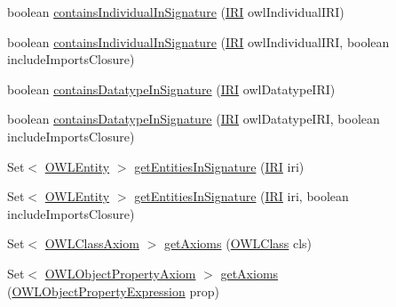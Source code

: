 \begin{DoxyCompactItemize}
\item 
boolean \hyperlink{interfaceorg_1_1semanticweb_1_1owlapi_1_1model_1_1_o_w_l_ontology_a74a8d82cd98c58960f8a2532610ff102}{contains\-Individual\-In\-Signature} (\hyperlink{classorg_1_1semanticweb_1_1owlapi_1_1model_1_1_i_r_i}{I\-R\-I} owl\-Individual\-I\-R\-I)
\item 
boolean \hyperlink{interfaceorg_1_1semanticweb_1_1owlapi_1_1model_1_1_o_w_l_ontology_af1fa719c72a742706f795f344876c2d8}{contains\-Individual\-In\-Signature} (\hyperlink{classorg_1_1semanticweb_1_1owlapi_1_1model_1_1_i_r_i}{I\-R\-I} owl\-Individual\-I\-R\-I, boolean include\-Imports\-Closure)
\item 
boolean \hyperlink{interfaceorg_1_1semanticweb_1_1owlapi_1_1model_1_1_o_w_l_ontology_ac9ccfd408cc970aaab2c5edab49b8635}{contains\-Datatype\-In\-Signature} (\hyperlink{classorg_1_1semanticweb_1_1owlapi_1_1model_1_1_i_r_i}{I\-R\-I} owl\-Datatype\-I\-R\-I)
\item 
boolean \hyperlink{interfaceorg_1_1semanticweb_1_1owlapi_1_1model_1_1_o_w_l_ontology_ab6880d8d511f062df0362fd32fd9cb87}{contains\-Datatype\-In\-Signature} (\hyperlink{classorg_1_1semanticweb_1_1owlapi_1_1model_1_1_i_r_i}{I\-R\-I} owl\-Datatype\-I\-R\-I, boolean include\-Imports\-Closure)
\item 
Set$<$ \hyperlink{interfaceorg_1_1semanticweb_1_1owlapi_1_1model_1_1_o_w_l_entity}{O\-W\-L\-Entity} $>$ \hyperlink{interfaceorg_1_1semanticweb_1_1owlapi_1_1model_1_1_o_w_l_ontology_abce65f400a7787faa24d15ebf659de83}{get\-Entities\-In\-Signature} (\hyperlink{classorg_1_1semanticweb_1_1owlapi_1_1model_1_1_i_r_i}{I\-R\-I} iri)
\item 
Set$<$ \hyperlink{interfaceorg_1_1semanticweb_1_1owlapi_1_1model_1_1_o_w_l_entity}{O\-W\-L\-Entity} $>$ \hyperlink{interfaceorg_1_1semanticweb_1_1owlapi_1_1model_1_1_o_w_l_ontology_a96c1ac467f5a981d53f527daaea55a41}{get\-Entities\-In\-Signature} (\hyperlink{classorg_1_1semanticweb_1_1owlapi_1_1model_1_1_i_r_i}{I\-R\-I} iri, boolean include\-Imports\-Closure)
\item 
Set$<$ \hyperlink{interfaceorg_1_1semanticweb_1_1owlapi_1_1model_1_1_o_w_l_class_axiom}{O\-W\-L\-Class\-Axiom} $>$ \hyperlink{interfaceorg_1_1semanticweb_1_1owlapi_1_1model_1_1_o_w_l_ontology_af95c5f071089ae80cc2d105153ef384f}{get\-Axioms} (\hyperlink{interfaceorg_1_1semanticweb_1_1owlapi_1_1model_1_1_o_w_l_class}{O\-W\-L\-Class} cls)
\item 
Set$<$ \hyperlink{interfaceorg_1_1semanticweb_1_1owlapi_1_1model_1_1_o_w_l_object_property_axiom}{O\-W\-L\-Object\-Property\-Axiom} $>$ \hyperlink{interfaceorg_1_1semanticweb_1_1owlapi_1_1model_1_1_o_w_l_ontology_a529d12aabbf714c8535961b96294677a}{get\-Axioms} (\hyperlink{interfaceorg_1_1semanticweb_1_1owlapi_1_1model_1_1_o_w_l_object_property_expression}{O\-W\-L\-Object\-Property\-Expression} prop)

\end{DoxyCompactItemize}
